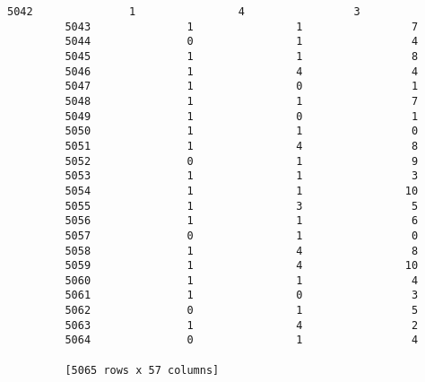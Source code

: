 \documentclass[11pt]{article}
\begin{document}
\begin{Verbatim}[commandchars=\\\{\}]
         5042               1                4                 3  
         5043               1                1                 7  
         5044               0                1                 4  
         5045               1                1                 8  
         5046               1                4                 4  
         5047               1                0                 1  
         5048               1                1                 7  
         5049               1                0                 1  
         5050               1                1                 0  
         5051               1                4                 8  
         5052               0                1                 9  
         5053               1                1                 3  
         5054               1                1                10  
         5055               1                3                 5  
         5056               1                1                 6  
         5057               0                1                 0  
         5058               1                4                 8  
         5059               1                4                10  
         5060               1                1                 4  
         5061               1                0                 3  
         5062               0                1                 5  
         5063               1                4                 2  
         5064               0                1                 4  
         
         [5065 rows x 57 columns]
\end{Verbatim}
            
\end{document}
